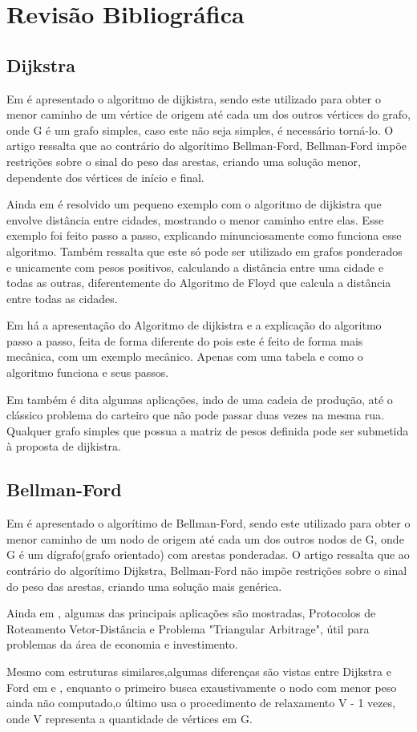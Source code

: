 \chapter{Revisão Bibliográfica}

\section{Dijkstra}

	Em \cite{algo} é apresentado o algoritmo de dijkistra, sendo este utilizado para obter o menor caminho de um vértice de origem até cada um dos outros vértices do  grafo, onde G é um grafo simples, caso este não seja simples, é necessário torná-lo. O artigo ressalta que ao contrário do algorítimo Bellman-Ford, Bellman-Ford impõe restrições sobre o sinal do peso das arestas, criando uma solução menor, dependente dos vértices de início e final.
	
	Ainda em \cite{algo} é resolvido um pequeno exemplo com o algoritmo de dijkistra que envolve distância entre cidades, mostrando o menor caminho entre elas. Esse exemplo foi feito passo a passo, explicando minunciosamente como funciona esse algoritmo. Também ressalta que este só pode ser utilizado em grafos ponderados e unicamente com pesos positivos, calculando a distância entre uma cidade e todas as outras, diferentemente do Algoritmo de Floyd que calcula a distância entre todas as cidades.
	
	Em \cite{barros2007algoritmo} há a apresentação do Algoritmo de dijkistra e a explicação do algoritmo passo a passo, feita de forma diferente do \cite{algo} pois este é feito de forma mais mecânica, com um exemplo mecânico. Apenas com uma tabela e como o algoritmo funciona e seus passos. 
	
	Em \cite{barros2007algoritmo} também é dita algumas aplicações, indo de uma cadeia de produção, até o clássico problema do carteiro que não pode passar duas vezes na mesma rua. Qualquer grafo simples que possua a matriz de pesos definida pode ser submetida à proposta de dijkistra.
	
\section{Bellman-Ford}	
	Em \cite{ford} é apresentado o algorítimo de Bellman-Ford, sendo este utilizado para obter o menor caminho de um nodo de origem até cada um dos outros nodos de  G, onde G é um dígrafo(grafo orientado) com arestas ponderadas. O artigo ressalta que ao contrário do algorítimo Dijkstra, Bellman-Ford não impõe restrições sobre o sinal do peso das arestas, criando uma solução mais genérica.

	Ainda em \cite{ford}, algumas das principais aplicações são mostradas, Protocolos de Roteamento Vetor-Distância e Problema "Triangular Arbitrage", útil para problemas da área de economia e investimento.

	Mesmo com estruturas similares,algumas diferenças são vistas entre Dijkstra e Ford em \cite{barros2007algoritmo} e \cite{ford}, enquanto o primeiro busca exaustivamente o nodo com menor peso ainda não computado,o último usa o procedimento de relaxamento V - 1 vezes, onde V representa a quantidade de vértices em G.